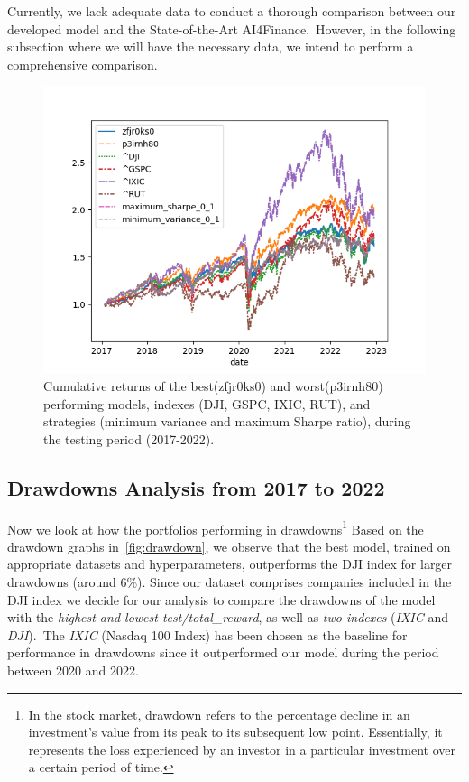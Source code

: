 \documentclass[../xlapes02]{subfiles}
\begin{document}
    Currently, we lack adequate data to conduct a thorough comparison between our developed model and the State-of-the-Art AI4Finance.\ However, in the following subsection where we will have the necessary data, we intend to perform a comprehensive comparison.
    \begin{figure}
        \centering
        \includegraphics[width=0.85\linewidth]{image/figure/returns}
        \caption{Cumulative returns of the best(zfjr0ks0) and worst(p3irnh80) performing models, indexes (DJI, GSPC, IXIC, RUT), and strategies (minimum variance and maximum Sharpe ratio), during the testing period (2017-2022).}
        \label{fig:cumulative_return}
    \end{figure}

    \subsection{Drawdowns Analysis from 2017 to 2022}\label{subsec:drawdowns}
    Now we look at how the portfolios performing in drawdowns\footnote{In the stock market, drawdown refers to the percentage decline in an investment's value from its peak to its subsequent low point. Essentially, it represents the loss experienced by an investor in a particular investment over a certain period of time.} Based on the drawdown graphs in~\cref{fig:drawdown}, we observe that the best model, trained on appropriate datasets and hyperparameters, outperforms the DJI index for larger drawdowns (around $6\%$). Since our dataset comprises companies included in the DJI index we decide for our analysis to compare the drawdowns of the model with the \emph{highest and lowest test/total\_reward}, as well as \emph{two indexes} (\emph{IXIC} and \emph{DJI}).\ The \emph{IXIC} (Nasdaq 100 Index) has been chosen as the baseline for performance in drawdowns since it outperformed our model during the period between 2020 and 2022.
\end{document}
